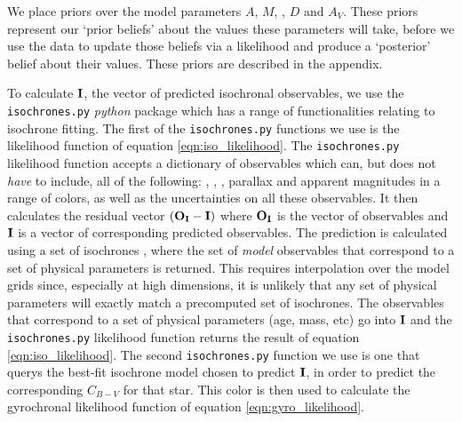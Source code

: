 We place priors over the model parameters $A$, $M$, \feh, $D$ and $A_V$.
These priors represent our `prior beliefs' about the values these parameters
will take, before we use the data to update those beliefs via a likelihood and
produce a `posterior' belief about their values.
These priors are described in the appendix.

To calculate ${\bf I}$, the vector of predicted isochronal observables, we use
the {\tt isochrones.py} {\it python} package which has a range of
functionalities relating to isochrone fitting.
The first of the {\tt isochrones.py} functions we use is the likelihood
function of equation \ref{eqn:iso_likelihood}.
The {\tt isochrones.py} likelihood function accepts a dictionary of
observables which can, but does not {\it have} to include, all of the
following: \teff, \logg, \feh, parallax and apparent magnitudes in a range of
colors, as well as the uncertainties on all these observables.
It then calculates the residual vector $({\bf O_I} - {\bf I})$ where ${\bf
O_I}$ is the vector of observables and ${\bf I}$ is a vector of corresponding
predicted observables.
The prediction is calculated using a set of isochrones \citep[we use the MIST
models,][]{paxton2011, paxton2013, paxton2015, dotter2016, choi2016, paxton2018},
where the set of {\it model} observables that correspond
to a set of physical parameters is returned.
This requires interpolation over the model grids since, especially at high
dimensions, it is unlikely that any set of physical parameters will exactly
match a precomputed set of isochrones.
The observables that correspond to a set of physical parameters (age, mass,
etc) go into ${\bf I}$ and the {\tt isochrones.py} likelihood function returns
the result of equation \ref{eqn:iso_likelihood}.
The second {\tt isochrones.py} function we use is one that querys the best-fit
isochrone model chosen to predict ${\bf I}$, in order to predict the
corresponding $C_{B-V}$ for that star.
This color is then used to calculate the gyrochronal likelihood function of
equation \ref{eqn:gyro_likelihood}.


